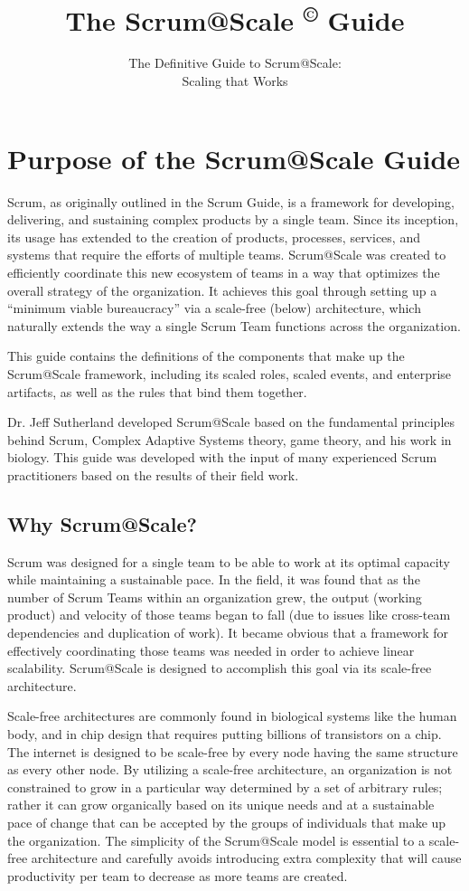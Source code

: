 \documentclass[12pt,a4paper,parskip=full]{scrartcl}
\title{\Huge{\color{red}\textbf{The Scrum@Scale 
\textsuperscript{\copyright} 
Guide}}}
\subtitle{\color{gray}The Definitive Guide to Scrum@Scale:\\ Scaling that Works}
\date{}
\begin{document}

\section{Purpose of the Scrum@Scale Guide}

Scrum, as originally outlined in the Scrum Guide, is a framework for developing, delivering, and sustaining complex products by a single team. Since its inception, its usage has extended to the creation of products, processes, services, and systems that require the efforts of multiple teams. Scrum@Scale was created to efficiently coordinate this new ecosystem of teams in a way that optimizes the overall strategy of the organization. It achieves this goal through setting up a ``minimum viable bureaucracy'' via a scale-free (below) architecture, which naturally extends the way a single Scrum Team functions across the organization.

This guide contains the definitions of the components that make up the Scrum@Scale framework, including its scaled roles, scaled events, and enterprise artifacts, as well as the rules that bind them together.

Dr. Jeff Sutherland developed Scrum@Scale based on the fundamental principles behind Scrum, Complex Adaptive Systems theory, game theory, and his work in biology. This guide was developed with the input of many experienced Scrum practitioners based on the results of their field work. 

\subsection{Why Scrum@Scale?}

Scrum was designed for a single team to be able to work at its optimal capacity while maintaining a sustainable pace. In the field, it was found that as the number of Scrum Teams within an organization grew, the output (working product) and velocity of those teams began to fall (due to issues like cross-team dependencies and duplication of work). It became obvious that a framework for effectively coordinating those teams was needed in order to achieve linear scalability. Scrum@Scale is designed to accomplish this goal via its scale-free architecture.

Scale-free architectures are commonly found in biological systems like the human body, and in chip design that requires putting billions of transistors on a chip. The internet is designed to be scale-free by every node having the same structure as every other node. By utilizing a scale-free architecture, an organization is not constrained to grow in a particular way determined by a set of arbitrary rules; rather it can grow organically based on its unique needs and at a sustainable pace of change that can be accepted by the groups of individuals that make up the organization. The simplicity of the Scrum@Scale model is essential to a scale-free architecture and carefully avoids introducing extra complexity that will cause productivity per team to decrease as more teams are created.
\end{document}
